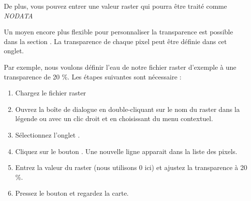 De plus, vous pouvez entrer une valeur raster qui pourra être traité comme {\em
NODATA}

Un moyen encore plus flexible pour personnaliser la transparence est possible
dans la section .
La transparence de chaque pixel peut être définie dans cet onglet.

Par exemple, nous voulons définir l'eau de notre fichier raster d'exemple
 à une transparence de 20 \%. Les étapes suivantes sont
nécessaire :
\begin{enumerate}
\item Chargez le fichier raster 
 \item Ouvrez la boîte de dialogue  en double-cliquant sur
le nom du raster dans la légende ou avec un clic droit et en choisissant
 du menu contextuel.
 \item Sélectionnez l'onglet .
  \item \label{enum:add} Cliquez sur le bouton
. Une
nouvelle ligne apparait dans la liste des pixels.
 \item \label{enum:transp} Entrez la valeur du raster (nous utilisons 0 ici)
et ajustez la transparence à 20 \%.
 \item Pressez le bouton  et regardez la carte.
\end{enumerate}

